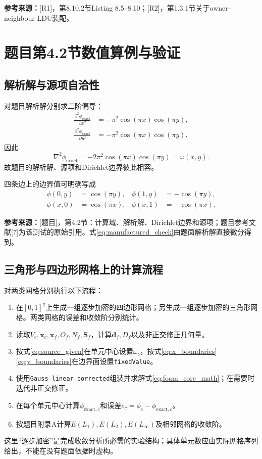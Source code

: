 \documentclass[UTF8,12pt,a4paper]{ctexart}
\numberwithin{equation}{section}
\newcommand{\Rone}{\textnormal{[R1]}}
\newcommand{\Rtwo}{\textnormal{[R2]}}
\newcommand{\Task}{\textnormal{[题目]}}
\newcommand{\source}[1]{%
  \par\smallskip
  \noindent\colorbox{sourcebg}{%
    \parbox{0.955\linewidth}{\footnotesize\color{sourcegray}\textbf{参考来源：}#1}%
  }
  \par\smallskip
}
\begin{document}
\source{\Rone，第8.10.2节Listing 8.5--8.10；\Rtwo，第1.3.1节关于owner--neighbour LDU装配。}

\newpage
\section{题目第4.2节数值算例与验证}

\subsection{解析解与源项自洽性}

对题目解析解分别求二阶偏导：
\begin{align}
  \frac{\partial^2\phi_{\mathrm{exact}}}{\partial x^2}
  &=-\pi^2\cos(\pi x)\cos(\pi y),
  \label{eq:exact_xx}\\
  \frac{\partial^2\phi_{\mathrm{exact}}}{\partial y^2}
  &=-\pi^2\cos(\pi x)\cos(\pi y).
  \label{eq:exact_yy}
\end{align}
因此
\begin{equation}
  \boxed{
  \nabla^2\phi_{\mathrm{exact}}
  =-2\pi^2\cos(\pi x)\cos(\pi y)
  =\omega(x,y).}
  \label{eq:manufactured_check}
\end{equation}
故题目的解析解、源项和Dirichlet边界彼此相容。

四条边上的边界值可明确写成
\begin{align}
  \phi(0,y)&=\cos(\pi y),
  &\phi(1,y)&=-\cos(\pi y),
  \label{eq:x_boundaries}\\
  \phi(x,0)&=\cos(\pi x),
  &\phi(x,1)&=-\cos(\pi x).
  \label{eq:y_boundaries}
\end{align}

\source{\Task，第4.2节：计算域、解析解、Dirichlet边界和源项；题目参考文献[7]为该测试的原始引用。式\eqref{eq:manufactured_check}由题面解析解直接微分得到。}

\subsection{三角形与四边形网格上的计算流程}

对两类网格分别执行以下流程：
\begin{enumerate}
  \item 在$[0,1]^2$上生成一组逐步加密的四边形网格；另生成一组逐步加密的三角形网格。两类网格的误差和收敛阶分别统计。
  \item 读取$V_c,\bm x_c,\bm x_f,O_f,N_f,\bm S_f$，计算$\bm d_f,D_f$以及非正交修正几何量。
  \item 按式\eqref{eq:source_given}在单元中心设置$\omega_c$，按式\eqref{eq:x_boundaries}--\eqref{eq:y_boundaries}在边界面设置\texttt{fixedValue}。
  \item 使用\texttt{Gauss linear corrected}组装并求解式\eqref{eq:foam_core_math}；在需要时迭代非正交修正。
  \item 在每个单元中心计算$\phi_{\mathrm{exact},c}$和误差$e_c=\phi_c-\phi_{\mathrm{exact},c}$。
  \item 按题目附录A计算$E(L_1),E(L_2),E(L_\infty)$及相邻网格的收敛阶。
\end{enumerate}
这里“逐步加密”是完成收敛分析所必需的实验结构；具体单元数应由实际网格序列给出，不能在没有题面依据时虚构。
\end{document}
